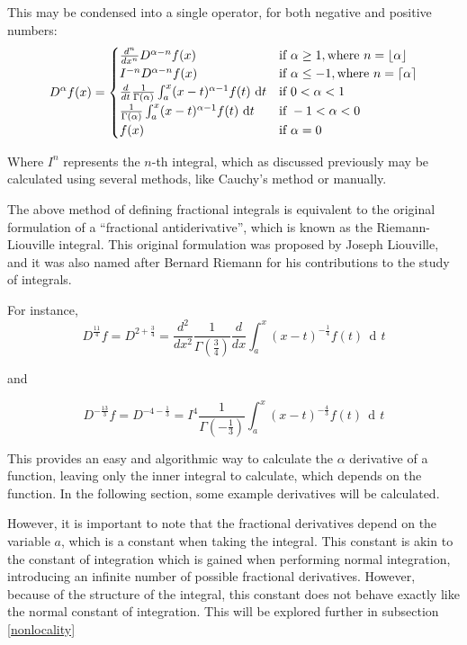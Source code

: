 \documentclass{article}
\DeclareMathOperator{\di}{\,d\!}
\DeclarePairedDelimiter\ceil{\lceil}{\rceil}
\DeclarePairedDelimiter\floor{\lfloor}{\rfloor}
\begin{document}
This may be condensed into a single operator, for both negative and positive
numbers:
\begin{equation*}
	D^\alpha f(x) =
	\begin{cases}
		\frac{d^n}{dx^n} D^{\alpha - n} f(x)
		& \text{if } \alpha \geq 1, \text{where } n = \floor{\alpha}\\

		I^{-n}D^{\alpha - n} f(x)
		& \text{if } \alpha \leq -1, \text{where } n = \ceil{\alpha} \\

		\frac{d}{dt} \frac{1}{\Gamma\left(\alpha\right)} \int_a^x (x-t)^{\alpha-1} f(t) \di t
		& \text{if } 0 < \alpha < 1 \\

		\frac{1}{\Gamma\left(\alpha\right)} \int_a^x (x-t)^{\alpha-1} f(t) \di t
		& \text{if } -1 < \alpha < 0 \\

		f(x) & \text{if } \alpha = 0
	\end{cases}
\end{equation*}

Where $I^n$ represents the $n$-th integral, which as discussed previously may
be calculated using several methods, like Cauchy's method or manually.

The above method of defining fractional integrals is equivalent to the original
formulation of a ``fractional antiderivative'', which is known as the
Riemann-Liouville integral. This original formulation was proposed by Joseph
Liouville, and it was also named after Bernard Riemann for his contributions to
the study of integrals. \parencite{lizorkin2020}

For instance,
$$
D^{\frac{11}{4}} f = D^{2+\frac{3}{4}}
				 = \frac{d^2}{dx^2}\frac{1}{\Gamma\left(\frac{3}{4}\right)}
				 \frac{d}{dx} \int_a^x\left(x-t\right)^{-\frac{1}{4}} f(t) \di t
$$

and

$$
D^{-\frac{13}{3}} f = D^{-4-\frac{1}{3}}
					= I^4 \frac{1}{\Gamma\left(-\frac{1}{3}\right)} \int_a^x \left(x-t\right)^{-\frac{4}{3}} f(t) \di t
$$

This provides an easy and algorithmic way to calculate the $\alpha$ derivative
of a function, leaving only the inner integral to calculate, which depends on
the function. In the following section, some example derivatives will be
calculated.

However, it is important to note that the fractional derivatives depend on the
variable $a$, which is a constant when taking the integral. This constant is
akin to the constant of integration which is gained when performing normal
integration, introducing an infinite number of possible fractional derivatives.
However, because of the structure of the integral, this constant does not behave
exactly like the normal constant of integration. This will be explored further in subsection \ref{nonlocality}
\end{document}
